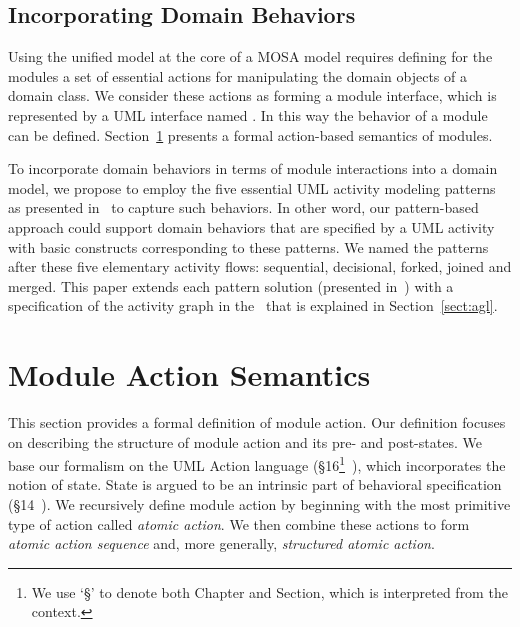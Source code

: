 \subsection{Incorporating Domain Behaviors} 
\label{sect:domainBehaviors}

Using the unified model at the core of a MOSA model requires defining for the modules a set of essential actions for manipulating the domain objects of a domain class.
%
We consider these actions as forming a module interface, which is represented by a UML interface named  . In this way the behavior of a module can be defined. Section~\ref{sect:actSemantics} presents a formal action-based semantics of modules.

To incorporate domain behaviors in terms of module interactions into a domain model, we propose to employ the five essential UML activity modeling patterns as presented in~\cite{le_domain_2018} to capture such behaviors. In other word, our pattern-based approach could support domain behaviors that are specified by a UML activity with basic constructs corresponding to these patterns. We named the patterns after these five elementary activity flows: sequential, decisional, forked, joined and merged. This paper extends each pattern solution (presented in~\cite{le_domain_2018}) with a specification of the activity graph in the \agl~that is explained in Section~\ref{sect:agl}. 

\section{Module Action Semantics}
\label{sect:actSemantics}

This section provides a formal definition of module action.
Our definition focuses on describing the structure of module action and its pre- and post-states. We base our formalism on the UML Action language (\S{16}\footnote{We use `\S{}' to denote both Chapter and Section, which is interpreted from the context.}~\cite{omg_unified_2015}), which incorporates the notion of state. State is argued to be an intrinsic part of behavioral specification (\S{14}~\cite{omg_unified_2015}).
%
We recursively define module action by beginning with the most primitive type of action called \textit{atomic action}. We then combine these actions to form \textit{atomic action sequence} and, more generally, \textit{structured atomic action}.


